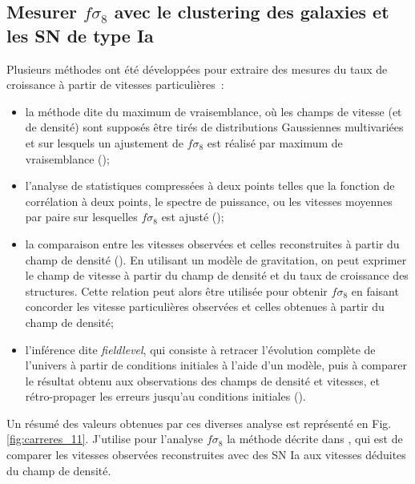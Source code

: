 \documentclass{book}
\begin{document}
\subsection{Mesurer $f\sigma_8$ avec le clustering des galaxies et les SN de type Ia}

 Plusieurs méthodes ont été développées pour extraire des mesures du taux de croissance à partir de vitesses particulières~:
 \begin{itemize}
     \item la méthode dite du maximum de vraisemblance, où les champs de vitesse (et de densité) sont supposés être tirés de distributions Gaussiennes multivariées et sur lesquels un ajustement de $f\sigma_8$ est réalisé par maximum de vraisemblance (\cite{johnson_6df_2014, huterer_testing_2017, howlett_2mtf_2017, adams_joint_2020, lai_using_2022, carreres_growth-rate_2023});
     \item l'analyse de statistiques compressées à deux points telles que la fonction de corrélation à deux points, le spectre de puissance, ou les vitesses moyennes par paire sur lesquelles $f\sigma_8$ est ajusté (\cite{nusser_velocity-density_2017, dupuy_estimation_2019, qin_redshift_2019, turner_local_2023});
     \item la comparaison entre les vitesses observées et celles reconstruites à partir du champ de densité (\cite{davis_effect_2011, carrick_cosmological_2015, boruah_cosmic_2020, said_joint_2020, stahl_peculiar-velocity_2021}). En utilisant un modèle de gravitation, on peut exprimer le champ de vitesse à partir du champ de densité et du taux de croissance des structures. Cette relation peut alors être utilisée pour obtenir $f\sigma_8$ en faisant concorder les vitesse particulières observées et celles obtenues à partir du champ de densité;
     \item l'inférence dite \textit{fieldlevel}, qui consiste à retracer l'évolution complète de l'univers à partir de conditions initiales à l'aide d'un modèle, puis à comparer le résultat obtenu aux observations des champs de densité et vitesses, et rétro-propager les erreurs jusqu'au conditions initiales (\cite{boruah_bayesian_2022, prideaux-ghee_field-based_2023}). 
\end{itemize}

Un résumé des valeurs obtenues par ces diverses analyse est représenté en Fig. \ref{fig:carreres_11}. J'utilise pour l'analyse $f\sigma_8$ la méthode décrite dans \cite{boruah_cosmic_2020,stahl_peculiar-velocity_2021}, qui est de comparer les vitesses observées reconstruites avec des SN Ia aux vitesses déduites du champ de densité.
\end{document}
